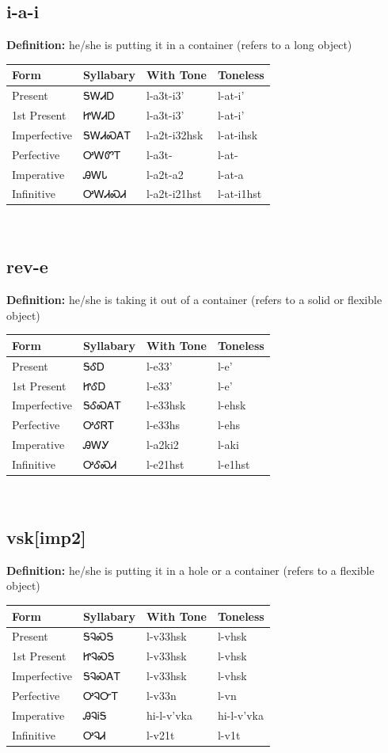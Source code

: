 \documentclass{article}%
\begin{document}
\subsection*{i-a-i}%
\textbf{Definition: }%
he/she is putting it in a container (refers to a long object)%
\\[0.5em]%
\begin{tabular}{|l|l|l|l|}%
\hline%
\textbf{Form}&\textbf{Syllabary}&\textbf{With Tone}&\textbf{Toneless}\\%
\hline%
Present&ᎦᎳᏗᎠ&l{-}a3t{-}i3'&l{-}at{-}i'\\%
1st Present&ᏥᎳᏗᎠ&l{-}a3t{-}i3'&l{-}at{-}i'\\%
Imperfective&ᎦᎳᏗᏍᎪᎢ&l{-}a2t{-}i32hsk&l{-}at{-}ihsk\\%
Perfective&ᎤᎳᏛᎢ&l{-}a3t{-}&l{-}at{-}\\%
Imperative&ᎯᎳᏓ&l{-}a2t{-}a2&l{-}at{-}a\\%
Infinitive&ᎤᎳᏗᏍᏗ&l{-}a2t{-}i21hst&l{-}at{-}i1hst\\%
\hline%
\end{tabular}%
\\[1em]%
\subsection*{rev-e}%
\textbf{Definition: }%
he/she is taking it out of a container (refers to a solid or flexible object)%
\\[0.5em]%
\begin{tabular}{|l|l|l|l|}%
\hline%
\textbf{Form}&\textbf{Syllabary}&\textbf{With Tone}&\textbf{Toneless}\\%
\hline%
Present&ᎦᎴᎠ&l{-}e33'&l{-}e'\\%
1st Present&ᏥᎴᎠ&l{-}e33'&l{-}e'\\%
Imperfective&ᎦᎴᏍᎪᎢ&l{-}e33hsk&l{-}ehsk\\%
Perfective&ᎤᎴᏒᎢ&l{-}e33hs&l{-}ehs\\%
Imperative&ᎯᎳᎩ&l{-}a2ki2&l{-}aki\\%
Infinitive&ᎤᎴᏍᏗ&l{-}e21hst&l{-}e1hst\\%
\hline%
\end{tabular}%
\\[1em]%
\subsection*{vsk[imp2]}%
\textbf{Definition: }%
he/she is putting it in a hole or a container (refers to a flexible object)%
\\[0.5em]%
\begin{tabular}{|l|l|l|l|}%
\hline%
\textbf{Form}&\textbf{Syllabary}&\textbf{With Tone}&\textbf{Toneless}\\%
\hline%
Present&ᎦᎸᏍᎦ&l{-}v33hsk&l{-}vhsk\\%
1st Present&ᏥᎸᏍᎦ&l{-}v33hsk&l{-}vhsk\\%
Imperfective&ᎦᎸᏍᎪᎢ&l{-}v33hsk&l{-}vhsk\\%
Perfective&ᎤᎸᏅᎢ&l{-}v33n&l{-}vn\\%
Imperative&ᎯᎸᎥᎦ&hi{-}l{-}v'vka&hi{-}l{-}v'vka\\%
Infinitive&ᎤᎸᏗ&l{-}v21t&l{-}v1t\\%
\hline%
\end{tabular}%
\\[1em]%
\end{document}

